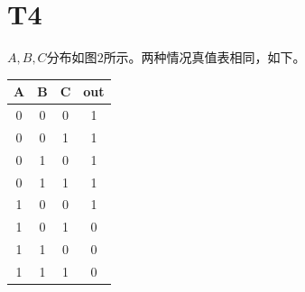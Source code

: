 \documentclass{article}
\begin{document}
\section*{T4}$A,B,C$分布如图$2$所示。两种情况真值表相同，如下。
\begin{table}[!ht]
    \centering
    \begin{tabular}{|c|c|c|c|}
    \hline
        A & B & C & out  \\ \hline
        0 & 0 & 0 & 1  \\ \hline
        0 & 0 & 1 & 1  \\ \hline
        0 & 1 & 0 & 1  \\ \hline
        0 & 1 & 1 & 1  \\ \hline
        1 & 0 & 0 & 1  \\ \hline
        1 & 0 & 1 & 0  \\ \hline
        1 & 1 & 0 & 0  \\ \hline
        1 & 1 & 1 & 0  \\ \hline
    \end{tabular}
\end{table}
\end{document}

